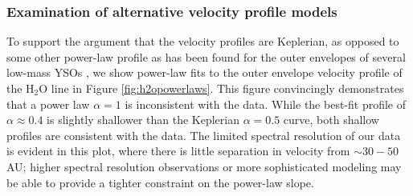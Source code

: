 \documentclass[twocolumn]{aastex61}
\newcommand{\msun}{\ensuremath{M_{\odot}}\xspace}			%
\newcommand{\hh}{\ensuremath{\textrm{H}_{2}}\xspace}			%
\newcommand{\methanol}{\ensuremath{\textrm{CH}_3\textrm{OH}}\xspace}
\newcommand{\water}{H$_{2}$O\xspace}		%
\newcommand{\kms}{\textrm{km~s}\ensuremath{^{-1}}\xspace}	%
\begin{document}


% 
% 

\subsubsection{Examination of alternative velocity profile models}
To support the argument that the velocity profiles are Keplerian, as opposed to
some other power-law profile as has been found for the outer envelopes of
several low-mass YSOs
\citep{Lee2017h,Aso2017b,Ohashi2014a,Lindberg2014a,Murillo2013a}, we show
power-law fits to the outer envelope velocity profile of the \water line
in Figure \ref{fig:h2opowerlaws}.
This figure convincingly demonstrates that
a power law $\alpha=1$ \citep[e.g., as observed in the outer parts of low-mass
YSO disks;][]{Aso2017b} is inconsistent with the data.  While the best-fit
profile of $\alpha\approx0.4$ is slightly shallower than the Keplerian
$\alpha=0.5$ curve, both shallow profiles are consistent with the data.
The limited spectral resolution of our data is evident in this plot, where
there is little separation in velocity from $\sim30-50$ AU; higher
spectral resolution observations or more sophisticated modeling may be able to
provide a tighter constraint on the power-law slope.
\end{document}
